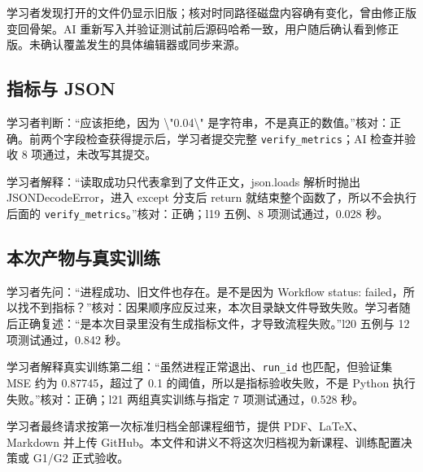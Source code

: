 学习者发现打开的文件仍显示旧版；核对时同路径磁盘内容确有变化，曾由修正版变回骨架。AI 重新写入并验证测试前后源码哈希一致，用户随后确认看到修正版。未确认覆盖发生的具体编辑器或同步来源。

\subsection{指标与 JSON}

学习者判断：“应该拒绝，因为 \textbackslash{}"0.04\textbackslash{}" 是字符串，不是真正的数值。”核对：正确。前两个字段检查获得提示后，学习者提交完整 \nolinkurl{verify_metrics}；AI 检查并验收 8 项通过，未改写其提交。

学习者解释：“读取成功只代表拿到了文件正文，json.loads 解析时抛出 JSONDecodeError，进入 except 分支后 return 就结束整个函数了，所以不会执行后面的 \nolinkurl{verify_metrics}。”核对：正确；l19 五例、8 项测试通过，0.028 秒。

\subsection{本次产物与真实训练}

学习者先问：“进程成功、旧文件也存在。是不是因为 Workflow status: failed，所以找不到指标？”核对：因果顺序应反过来，本次目录缺文件导致失败。学习者随后正确复述：“是本次目录里没有生成指标文件，才导致流程失败。”l20 五例与 12 项测试通过，0.842 秒。

学习者解释真实训练第二组：“虽然进程正常退出、\nolinkurl{run_id} 也匹配，但验证集 MSE 约为 0.87745，超过了 0.1 的阈值，所以是指标验收失败，不是 Python 执行失败。”核对：正确；l21 两组真实训练与指定 7 项测试通过，0.528 秒。

学习者最终请求按第一次标准归档全部课程细节，提供 PDF、LaTeX、Markdown 并上传 GitHub。本文件和讲义不将这次归档视为新课程、训练配置决策或 G1/G2 正式验收。
